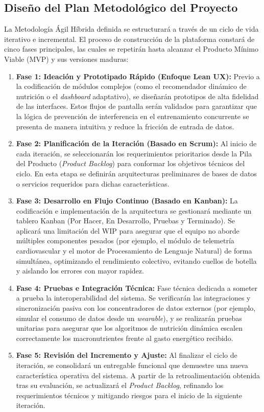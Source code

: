 \documentclass[12pt]{article}
\begin{document}
\subsection{Diseño del Plan Metodológico del Proyecto}

La Metodología Ágil Híbrida definida se estructurará a través de un ciclo de vida iterativo e incremental. El proceso de construcción de la plataforma constará de cinco fases principales, las cuales se repetirán hasta alcanzar el Producto Mínimo Viable (MVP) y sus versiones maduras:

\begin{enumerate}
    \item \textbf{Fase 1: Ideación y Prototipado Rápido (Enfoque Lean UX):}
    Previo a la codificación de módulos complejos (como el recomendador dinámico de nutrición o el \textit{dashboard} adaptativo), se diseñarán prototipos de alta fidelidad de las interfaces. Estos flujos de pantalla serán validados para garantizar que la lógica de prevención de interferencia en el entrenamiento concurrente se presenta de manera intuitiva y reduce la fricción de entrada de datos.
    
    \item \textbf{Fase 2: Planificación de la Iteración (Basado en Scrum):}
    Al inicio de cada iteración, se seleccionarán los requerimientos prioritarios desde la Pila del Producto (\textit{Product Backlog}) para conformar los objetivos técnicos del ciclo. En esta etapa se definirán arquitecturas preliminares de bases de datos o servicios requeridos para dichas características.
    
    \item \textbf{Fase 3: Desarrollo en Flujo Continuo (Basado en Kanban):}
    La codificación e implementación de la arquitectura se gestionará mediante un tablero Kanban (Por Hacer, En Desarrollo, Pruebas y Terminado). Se aplicará una limitación del WIP para asegurar que el equipo no aborde múltiples componentes pesados (por ejemplo, el módulo de telemetría cardiovascular y el motor de Procesamiento de Lenguaje Natural) de forma simultánea, optimizando el rendimiento colectivo, evitando cuellos de botella y aislando los errores con mayor rapidez.
    
    \item \textbf{Fase 4: Pruebas e Integración Técnica:}
    Fase técnica dedicada a someter a prueba la interoperabilidad del sistema. Se verificarán las integraciones y sincronización pasiva con los concentradores de datos externos (por ejemplo, simular el consumo de datos desde un \textit{wearable}), y se realizarán pruebas unitarias para asegurar que los algoritmos de nutrición dinámica escalen correctamente los macronutrientes frente al gasto energético recibido.
    
    \item \textbf{Fase 5: Revisión del Incremento y Ajuste:}
    Al finalizar el ciclo de iteración, se consolidará un entregable funcional que demuestre una nueva característica operativa del sistema. A partir de la retroalimentación obtenida tras su evaluación, se actualizará el \textit{Product Backlog}, refinando los requerimientos técnicos y mitigando riesgos para el inicio de la siguiente iteración.
\end{enumerate}
\end{document}
